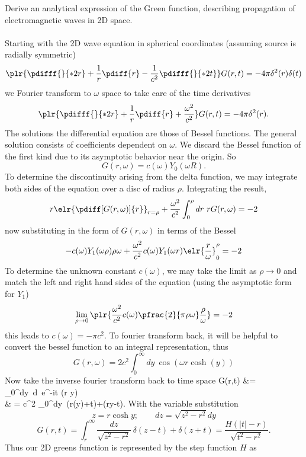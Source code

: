 \documentclass[10pt,letterpaper]{article}
\begin{document}
	\item
	Derive an analytical expression of the Green function, describing propagation of electromagnetic waves
	in 2D space. 
	\\ \\
	Starting with the 2D wave equation in spherical coordinates (assuming source is radially symmetric)
	\[
		\plr{\pdifff{}{*2r}+\frac{1}{r}\pdiff{r}-\frac{1}{c^2}\pdifff{}{*2t}}G(r,t) = -4\pi \delta^2(r)\delta(t)
	\]
	we Fourier transform to $\omega$ space to take care of the time derivatives
	\[
		\plr{\pdifff{}{*2r}+\frac{1}{r}\pdiff{r}+\frac{\omega^2}{c^2}}G(r,t) = -4\pi \delta^2(r).
	\]
	The solutions the differential equation are those of Bessel functions. The general solution consists
	of coefficients dependent on $\omega$. We discard the Bessel function of the first kind due to its asymptotic behavior 		near the origin. So
	\[
		G(r,\omega) = c(\omega)Y_0(\omega R).
	\]
	To determine the discontinuity arising from the delta function, we may integrate both sides of the equation
	over a disc of radius $\rho$. Integrating the result,
	\[
		 r\elr{\pdiff[G(r,\omega)]{r}}_{r=\rho}+\frac{\omega^2}{c^2}\int_0^\rho dr\ r G(r,\omega)= -2
	\]
	now substituting in the form of $G(r,\omega)$ in terms of the Bessel
	\[
		-c(\omega)Y_1(\omega\rho)\rho\omega +\frac{\omega^2}{c^2}c(\omega)Y_1(\omega r)\elr{\frac{r}{\omega}
		}^\rho_0 = -2
	\]
	To determine the unknown constant $c(\omega)$, we may take the limit as $\rho\to 0$ and match the left and 
	right hand sides of the equation (using the asymptotic form for $Y_1$)
	\[
		\lim_{\rho\to 0} \plr{\frac{\omega^2}{c^2}c(\omega)\pfrac{2}{\pi \rho\omega}\frac{\rho}{\omega}} = -2
	\]
	this leads to $c(\omega) = -\pi c^2$. To fourier transform back, it will be helpful to convert the bessel function
	to an integral representation, thus
	\[
		G(r,\omega) = 2c^2\int_0^\infty dy\ \cos(\omega r\cosh(y))
	\]
	Now take the inverse fourier transform back to time space
	\ba
		G(r,t) &=  \int \int_0^\infty dy\ d\omega\ e^{-i\omega t} \cos(\omega r \cosh y)\\
		& = \sqrt{2\pi}c^2 \int_0^\infty dy\ \delta(r\cosh(y)+t)+\delta(r\cosh y-t).
	\ea
	With the variable substitution
	\[
		z = r\cosh y;\qquad dz = \sqrt{z^2-r^2}dy
	\]
	\[
		G(r,t) = \int_r^\infty \frac{dz}{\sqrt{z^2-r^2}}\ \delta(z-t)+\delta(z+t) = \frac{H(|t|-r)}{\sqrt{t^2-r^2}}.
	\]
	Thus our 2D greens function is represented by the step function $H$ as
\end{document}
